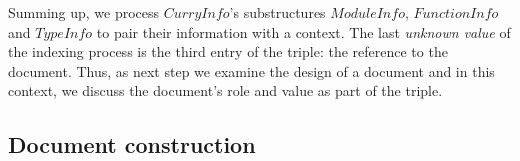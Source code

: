 \documentclass[%
	pdftex,%
	a4paper,%
	oneside,%
	chapterprefix,%
	headsepline,%
	12pt%
]{scrbook}
\newcommand{\Conid}[1]{\mathit{#1}}
\begin{document}
Summing up, we process \ensuremath{\Conid{CurryInfo}}'s substructures \ensuremath{\Conid{ModuleInfo}},
\ensuremath{\Conid{FunctionInfo}} and \ensuremath{\Conid{TypeInfo}} to pair their information with a
context. %
The last \emph{unknown value} of the indexing process is the third
entry of the triple: the reference to the document. %
Thus, as next step we examine the design of a document and in this
context, we discuss the document's role and value as part of the
triple.

\subsection{Document construction}



  
\end{document}
